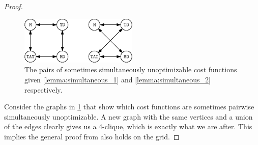 \begin{proof}
	\begin{figure}[h]
		\centering
		\includegraphics[width=0.5\textwidth]{ipe/sim_thm.eps}
		\caption{
			The pairs of sometimes simultaneously unoptimizable cost functions given \cref{lemma:simultaneous_1} and \cref{lemma:simultaneous_2} respectively.
		}
		\label{fig:sim_separate}
	\end{figure}

	Consider the graphs in \cref{fig:sim_separate} that show which cost functions are sometimes pairwise simultaneously unoptimizable. A new graph with the same vertices and a union of the edges clearly gives us a 4-clique, which is exactly what we are after. This implies the general proof from \cite{corr/YuL15c} also holds on the grid.
\end{proof}


